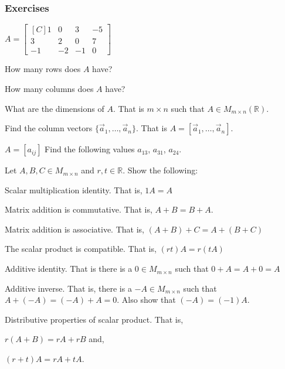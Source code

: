 \subsubsection{Exercises}
\begin{exercise}
$A=\begin{bmatrix*}[C]
1  & 0  & 3  & -5\\
3  & 2  & 0  & 7 \\
-1 & -2 & -1 & 0
\end{bmatrix*}$\\
\begin{inparaenum}[a.)]
\item How many rows does $A$ have?\\
\item How many columns does $A$ have?\\
\item What are the dimensions of $A$. That is $m \times n$ such that 
$A \in M_{m\times n}(\mathbb{R})$.\\
\item Find the column vectors $\{\vec{a}_1,\ldots,\vec{a}_n\}$. That is
$A=[\vec{a}_1,\ldots,\vec{a}_n]$.\\
\item $A=[a_{ij}]$ Find the following values $a_{13}$, $a_{31}$, $a_{24}$. 
\end{inparaenum}
\end{exercise}
\begin{exercise}
Let $A,B,C \in M_{m\times n}$ and $r,t \in \mathbb{R}$. Show 
the following:\\
\begin{inparaenum}[a.)]
\item Scalar multiplication identity. That is, $1 A=A$\\
\item Matrix addition is commutative. That is, 
$A+B=B+A$.\\
\item Matrix addition is associative. That is, 
$(A+B)+C=A+(B+C)$\\
\item The scalar product is compatible. That is, $(rt)A=r(tA)$\\
\item Additive identity. That is there is a $0\in M_{m\times n}$ such that
 $0+A=A+0=A$\\
\item Additive inverse. That is, there is a $-A \in M_{m\times n}$ such 
that $A+(-A)=(-A)+A=0$.
Also show that $(-A)=(-1)A$. \\
\item Distributive properties of scalar product. That is, \\
\begin{inparaenum}[i.)]
\indent \item  $r(A+B)=rA+rB$ and,\\
\indent \item  $(r+t)A=rA+tA$.\\
\end{inparaenum}
\end{inparaenum} 
\end{exercise}
